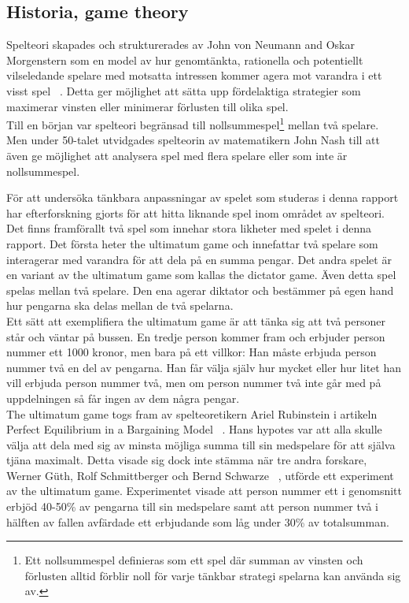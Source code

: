 \subsection{Historia, game theory}
Spelteori skapades och strukturerades av John von Neumann and Oskar Morgenstern som en model av hur genomtänkta, rationella och potentiellt vilseledande spelare med motsatta intressen kommer agera mot varandra i ett visst spel ~\cite{Flake:2001}. Detta ger möjlighet att sätta upp fördelaktiga strategier som maximerar vinsten eller minimerar förlusten till olika spel.\\

\noindent Till en början var spelteori begränsad till nollsummespel\footnote{Ett nollsummespel definieras som ett spel där summan av vinsten och förlusten alltid förblir noll för varje tänkbar strategi spelarna kan använda sig av.} mellan två spelare. Men under 50-talet utvidgades spelteorin av matematikern John Nash till att även ge möjlighet att analysera spel med flera spelare eller som inte är nollsummespel. 

\noindent För att undersöka tänkbara anpassningar av spelet som studeras i denna rapport har efterforskning gjorts för att hitta liknande spel inom området av spelteori. Det finns framförallt två spel som innehar stora likheter med spelet i denna rapport. Det första heter the ultimatum game och innefattar två spelare som interagerar med varandra för att dela på en summa pengar. Det andra spelet är en variant av the ultimatum game som kallas the dictator game. Även detta spel spelas mellan två spelare. Den ena agerar diktator och bestämmer på egen hand hur pengarna ska delas mellan de två spelarna.\\

\noindent Ett sätt att exemplifiera the ultimatum game är att tänka sig att två personer står och väntar på bussen. En tredje person kommer fram och erbjuder person nummer ett 1000 kronor, men bara på ett villkor: Han måste erbjuda person nummer två en del av pengarna. Han får välja själv hur mycket eller hur litet han vill erbjuda person nummer två, men om person nummer två inte går med på uppdelningen så får ingen av dem några pengar.\\

\noindent The ultimatum game togs fram av spelteoretikern Ariel Rubinstein i artikeln Perfect Equilibrium in a Bargaining Model ~\cite{Rubinstein:1982}. Hans hypotes var att alla skulle välja att dela med sig av minsta möjliga summa till sin medspelare för att själva tjäna maximalt. Detta visade sig dock inte stämma när tre andra forskare, Werner Güth, Rolf Schmittberger och Bernd Schwarze ~\cite{Werner:1982}, utförde ett experiment av the ultimatum game. Experimentet visade att person nummer ett i genomsnitt erbjöd 40-50\% av pengarna till sin medspelare samt att person nummer två i hälften av fallen avfärdade ett erbjudande som låg under 30\% av totalsumman.\\


